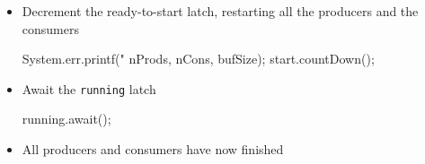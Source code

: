 \documentclass{concdistfoils}
\begin{document}
\begin{slide}
\begin{itemize}
\item Decrement the ready-to-start latch, restarting all the producers and the consumers
\begin{class}{}

    System.err.printf("%
                      nProds, nCons, bufSize);
    start.countDown(); 
\end{class}
\vfill
\item Await the \texttt{running} latch 
\begin{class}{}

    running.await(); 
\end{class}
\item All producers and consumers have now finished
\begin{class}{}
      

\end{class}
\end{itemize}
\end{slide}
\end{document}
